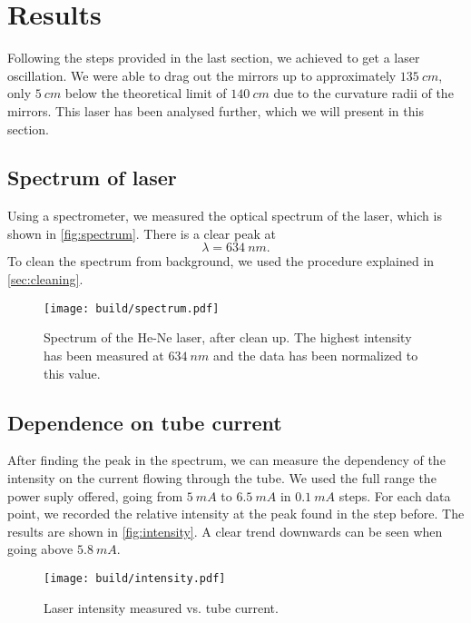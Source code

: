 \section{Results}
\label{sec:results}
Following the steps provided in the last section, we achieved to get a laser oscillation. We were
able to drag out the mirrors up to approximately $\SI{135}{cm}$, only $\SI{5}{cm}$ below the
theoretical limit of $\SI{140}{cm}$ due to the curvature radii of the mirrors. This laser has been
analysed further, which we will present in this section.

\subsection{Spectrum of laser}
\label{sec:Spectrum of laser}
Using a spectrometer, we measured the optical spectrum of the laser, which is shown in
\autoref{fig:spectrum}. There is a clear peak at
\begin{equation}
  \lambda = \SI{634}{nm}.
\end{equation}
To clean the spectrum from background, we used the procedure explained in \autoref{sec:cleaning}.

\begin{figure*}
  \centering
  \texttt{[image: build/spectrum.pdf]}
  \caption{Spectrum of the He-Ne laser, after clean up. The highest intensity has been measured at $\SI{634}{nm}$
  and the data has been normalized to this value.}
  \label{fig:spectrum}
\end{figure*}

\subsection{Dependence on tube current}
\label{sec:Dependence on tube current}
After finding the peak in the spectrum, we can measure the dependency of the intensity on the
current flowing through the tube. We used the full range the power suply offered, going from
$\SI{5}{mA}$ to $\SI{6.5}{mA}$ in $\SI{0.1}{mA}$ steps. For each data point, we recorded the
relative intensity at the peak found in the step before. The results are shown in
\autoref{fig:intensity}. A clear trend downwards can be seen when going above $\SI{5.8}{mA}$.

\begin{figure*}
  \centering
  \texttt{[image: build/intensity.pdf]}
  \caption{Laser intensity measured vs. tube current.}
  \label{fig:intensity}
\end{figure*}
